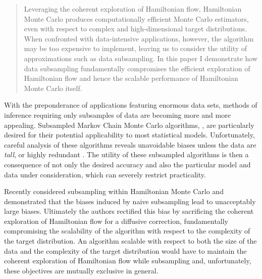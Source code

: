 \documentclass{article}
\begin{document}


\begin{abstract}
Leveraging the coherent exploration of Hamiltonian flow, Hamiltonian Monte Carlo 
produces computationally efficient Monte Carlo estimators, even with respect to
complex and high-dimensional target distributions.  When confronted with data-intensive 
applications, however, the algorithm may be too expensive to implement, leaving us to 
consider the utility of approximations such as data subsampling.  In this paper I demonstrate
how data subsampling fundamentally compromises the efficient exploration of Hamiltonian 
flow and hence the scalable performance of Hamiltonian Monte Carlo itself.
\end{abstract}

With the preponderance of applications featuring enormous data sets,
methods of inference requiring only subsamples of data are becoming 
more and more appealing.  Subsampled Markov Chain Monte Carlo 
algorithms, \cite{NeiswangerEtAl:2013, WellingEtAl:2011}, are particularly
desired for their potential applicability to most statistical models.  Unfortunately, 
careful analysis of these algorithms reveals unavoidable biases unless 
the data are \textit{tall}, or highly redundant 
\cite{BardenetEtAl:2014, TehEtAl:2014, VollmerEtAl:2015}.  
The utility of these subsampled algorithms is then a consequence 
of not only the desired accuracy and also the particular model and data
under consideration, which can severely restrict practicality.

Recently \cite{ChenEtAl:2014} considered subsampling within Hamiltonian
Monte Carlo \cite{DuaneEtAl:1987, Neal:2011, BetancourtEtAl:2014} and 
demonstrated that the biases induced by naive subsampling lead to 
unacceptably large biases.  Ultimately the authors rectified this bias by
sacrificing the coherent exploration of Hamiltonian flow for a diffusive correction, 
fundamentally compromising the scalability of the algorithm with respect to
the complexity of the target distribution.  An algorithm scalable with respect to
both the size of the data and the complexity of the target distribution would
have to maintain the coherent exploration of Hamiltonian flow while 
subsampling and, unfortunately, these objectives are mutually exclusive in
general.
\end{document}

